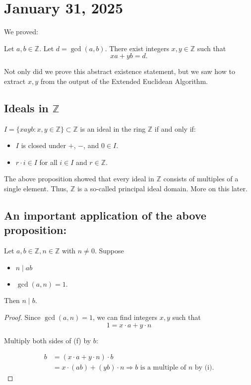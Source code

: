 \documentclass[11pt]{article}
\begin{document}
\section{January 31, 2025}

We proved:

\begin{proposition}
    Let $a, b \in \mathbb{Z}$. Let $d = \operatorname{gcd}(a, b)$. There exist integers $x, y \in \mathbb{Z}$ such that
    \[
        xa + yb = d.
    \]
\end{proposition}

Not only did we prove this abstract existence statement, but we saw how to
extract \(x, y\) from the output of the Extended Euclidean Algorithm.

\subsection{Ideals in \(\mathbb{Z}\)}

\(I = \{xayb : x, y \in \mathbb{Z}\} \subset \mathbb{Z}\) is an ideal in the ring \(\mathbb{Z}\) if and only if:

\begin{itemize}
    \item \(I\) is closed under \(+\), \(-\), and \(0 \in I\).
    \item \(r \cdot i \in I\) for all \(i \in I\) and \(r \in \mathbb{Z}\).
\end{itemize}

The above proposition showed that every ideal in \(\mathbb{Z}\) consists of
multiples of a single element. Thus, \(\mathbb{Z}\) is a so-called principal
ideal domain. More on this later.

\subsection{An important application of the above proposition:}

\begin{lemma}
    Let \(a, b \in \mathbb{Z}, n \in \mathbb{Z}\) with \(n \neq 0\). Suppose

    \begin{itemize}
        \item \(n \mid ab\)
        \item \(\operatorname{gcd}(a, n) = 1\).
    \end{itemize}

    Then \(n \mid b\).
\end{lemma}
\begin{proof}
    Since \(\operatorname{gcd}(a, n) = 1\), we can find integers \(x, y\) such that
    \[
        1 = x \cdot a + y \cdot n
    \]

    Multiply both sides of (f) by \(b\):

    \[
        \begin{aligned}
            b & = (x \cdot a + y \cdot n) \cdot b                                                       \\
              & = x \cdot (ab) + (yb) \cdot n \Rightarrow b \text{ is a multiple of } n \text{ by (i)}.
        \end{aligned}
    \]
\end{proof}
\end{document}
